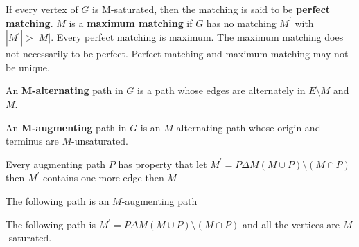 			\begin{definition}
				If every vertex of $G$ is M-saturated, then the matching is said to be \textbf{perfect matching}. $M$ is a \textbf{maximum matching} if $G$ has no matching $M^\prime$ with $|M^\prime| > |M|$. Every perfect matching is maximum. The maximum matching does not necessarily to be perfect. Perfect matching and maximum matching may not be unique.
			\end{definition}

			\begin{definition}[M-alternating]
				An \textbf{M-alternating} path in $G$ is a path whose edges are alternately in $E\setminus M$ and $M$.
			\end{definition}

			\begin{definition}[M-augmenting]
				An \textbf{M-augmenting} path in $G$ is an $M$-alternating path whose origin and terminus are $M$-unsaturated.
			\end{definition}

			\begin{lemma}
				Every augmenting path $P$ has property that let $M^\prime = P\Delta M (M \cup P) \setminus (M \cap P)$ then $M^\prime$ contains one more edge then $M$
			\end{lemma}

			The following path is an $M$-augmenting path
			\begin{figure}[!ht]
				\centering
			\end{figure}

			The following path is $M^\prime = P\Delta M (M \cup P) \setminus (M \cap P)$ and all the vertices are $M$-saturated.

			\begin{figure}[!ht]
				\centering
			\end{figure}

